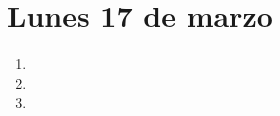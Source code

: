\documentclass[11pt,spanish]{article}
\begin{document}
  \thispagestyle{empty}
  \section*{Lunes 17 de marzo}

  \begin{enumerate}[font=\Large\bfseries]
    \item
      
    \item
      
    \item
      
  \end{enumerate}
\end{document}
